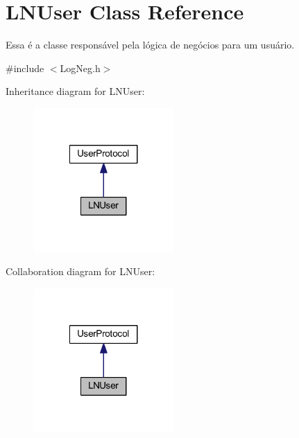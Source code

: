 \hypertarget{class_l_n_user}{\section{L\-N\-User Class Reference}
\label{class_l_n_user}
}


Essa é a classe responsável pela lógica de negócios para um usuário.  




{\ttfamily \#include $<$Log\-Neg.\-h$>$}



Inheritance diagram for L\-N\-User\-:
\nopagebreak
\begin{figure}[H]
\begin{center}
\leavevmode
\includegraphics[width=152pt]{class_l_n_user__inherit__graph}
\end{center}
\end{figure}


Collaboration diagram for L\-N\-User\-:
\nopagebreak
\begin{figure}[H]
\begin{center}
\leavevmode
\includegraphics[width=152pt]{class_l_n_user__coll__graph}
\end{center}
\end{figure}
